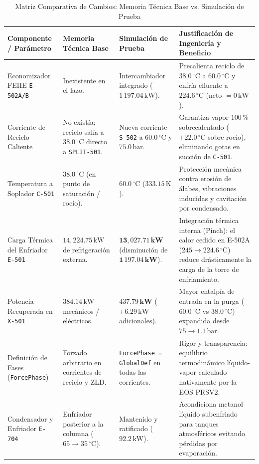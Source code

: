 \documentclass[11pt,a4paper]{article}
\begin{document}
\begin{table}[H]
\centering
\small
\caption{Matriz Comparativa de Cambios: Memoria Técnica Base vs. Simulación de Prueba}
\label{tab:matriz_comparativa}
\begin{tabularx}{\textwidth}{p{3.8cm} p{3.3cm} p{3.5cm} X}
\toprule
\textbf{Componente / Parámetro} & \textbf{Memoria Técnica Base} & \textbf{Simulación de Prueba} & \textbf{Justificación de Ingeniería y Beneficio} \\
\midrule
Economizador FEHE \texttt{E-502A/B} & Inexistente en el lazo. & Intercambiador integrado ($1\,197.04\,\text{kW}$). & Precalienta reciclo de $38.0\,^\circ\text{C}$ a $60.0\,^\circ\text{C}$ y enfría efluente a $224.6\,^\circ\text{C}$ (neto $= 0\,\text{kW}$). \\
\addlinespace
Corriente de Reciclo Caliente & No existía; reciclo salía a $38.0\,^\circ\text{C}$ directo a \texttt{SPLIT-501}. & Nueva corriente \texttt{S-502} a $60.0\,^\circ\text{C}$ y $75.0\,\text{bar}$. & Garantiza vapor $100\,\%$ sobrecalentado ($+22.0\,^\circ\text{C}$ sobre rocío), eliminando gotas en succión de \texttt{C-501}. \\
\addlinespace
Temperatura a Soplador \texttt{C-501} & $38.0\,^\circ\text{C}$ (en punto de saturación / rocío). & $60.0\,^\circ\text{C}$ ($333.15\,\text{K}$). & Protección mecánica contra erosión de álabes, vibraciones inducidas y cavitación por condensado. \\
\addlinespace
Carga Térmica del Enfriador \texttt{E-501} & $14{,}224.75\,\text{kW}$ de refrigeración externa. & $\mathbf{13{,}027.71\,\text{kW}}$ (disminución de $\mathbf{1\,197.04\,\text{kW}}$). & Integración térmica interna (Pinch): el calor cedido en E-502A ($245 \to 224.6\,^\circ\text{C}$) reduce drásticamente la carga de la torre de enfriamiento. \\
\addlinespace
Potencia Recuperada en \texttt{X-501} & $384.14\,\text{kW}$ mecánicos / eléctricos. & $\mathbf{437.79\,\text{kW}}$ ($+6.29\,\text{kW}$ adicionales). & Mayor entalpía de entrada en la purga ($60.0\,^\circ\text{C}$ vs $38.0\,^\circ\text{C}$) expandida desde $75 \to 1.1\,\text{bar}$. \\
\addlinespace
Definición de Fases (\texttt{ForcePhase}) & Forzado arbitrario en corrientes de reciclo y ZLD. & \texttt{ForcePhase = GlobalDef} en todas las corrientes. & Rigor y transparencia: equilibrio termodinámico líquido-vapor calculado nativamente por la EOS PRSV2. \\
\addlinespace
Condensador y Enfriador \texttt{E-704} & Enfriador posterior a la columna ($65 \to 35\,^\circ\text{C}$). & Mantenido y ratificado ($92.2\,\text{kW}$). & Acondiciona metanol líquido subenfriado para tanques atmosféricos evitando pérdidas por evaporación. \\

\end{tabularx}
\end{table}
\end{document}
